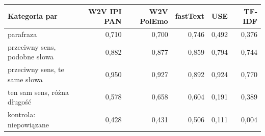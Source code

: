 \begin{tabular}{lrrrrr}
\toprule
Kategoria par & W2V IPI PAN & W2V PolEmo & fastText & USE & TF-IDF \\
\midrule
parafraza & 0{,}710 & 0{,}700 & 0{,}746 & 0{,}492 & 0{,}376 \\
przeciwny sens, podobne słowa & 0{,}882 & 0{,}877 & 0{,}859 & 0{,}794 & 0{,}744 \\
przeciwny sens, te same słowa & 0{,}950 & 0{,}927 & 0{,}892 & 0{,}924 & 0{,}770 \\
ten sam sens, różna długość & 0{,}578 & 0{,}658 & 0{,}604 & 0{,}191 & 0{,}389 \\
kontrola: niepowiązane & 0{,}428 & 0{,}431 & 0{,}506 & 0{,}111 & 0{,}004 \\
\bottomrule
\end{tabular}
